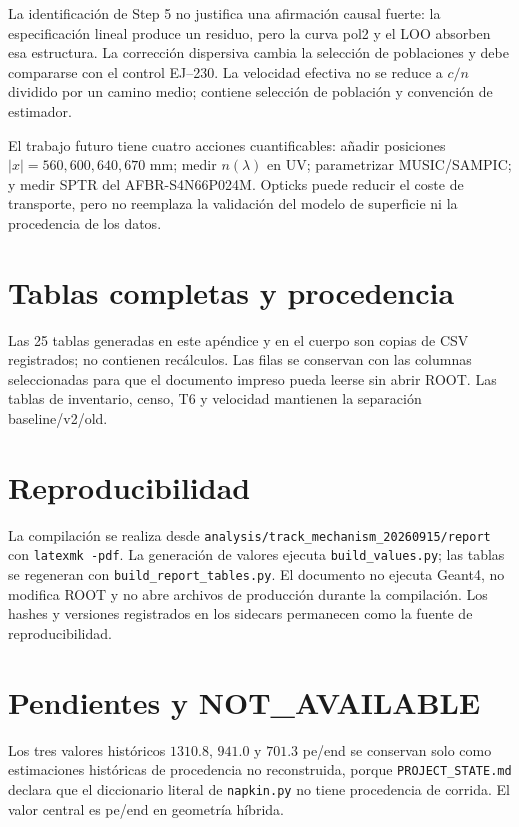 La identificación de Step 5 no justifica una afirmación causal fuerte: la especificación lineal produce un residuo, pero la curva pol2 y el LOO absorben esa estructura. La corrección dispersiva cambia la selección de poblaciones y debe compararse con el control EJ--230. La velocidad efectiva no se reduce a $c/n$ dividido por un camino medio; contiene selección de población y convención de estimador.

El trabajo futuro tiene cuatro acciones cuantificables: añadir posiciones $|x|=560,600,640,670$ mm; medir $n(\lambda)$ en UV; parametrizar MUSIC/SAMPIC; y medir SPTR del AFBR-S4N66P024M. Opticks puede reducir el coste de transporte, pero no reemplaza la validación del modelo de superficie ni la procedencia de los datos.

\appendix
\chapter{Tablas completas y procedencia}
Las 25 tablas generadas en este apéndice y en el cuerpo son copias de CSV registrados; no contienen recálculos. Las filas se conservan con las columnas seleccionadas para que el documento impreso pueda leerse sin abrir ROOT. Las tablas de inventario, censo, T6 y velocidad mantienen la separación baseline/v2/old.


\chapter{Reproducibilidad}
La compilación se realiza desde \texttt{analysis/track\_mechanism\_20260915/report} con \texttt{latexmk -pdf}. La generación de valores ejecuta \texttt{build\_values.py}; las tablas se regeneran con \texttt{build\_report\_tables.py}. El documento no ejecuta Geant4, no modifica ROOT y no abre archivos de producción durante la compilación. Los hashes y versiones registrados en los sidecars permanecen como la fuente de reproducibilidad.

\chapter{Pendientes y NOT\_AVAILABLE}
Los tres valores históricos $1310.8$, $941.0$ y $701.3$ pe/end se conservan solo como estimaciones históricas de procedencia no reconstruida, porque \texttt{PROJECT\_STATE.md} declara que el diccionario literal de \texttt{napkin.py} no tiene procedencia de corrida. El valor central es \HybridNpePerEnd{} pe/end en geometría híbrida.

